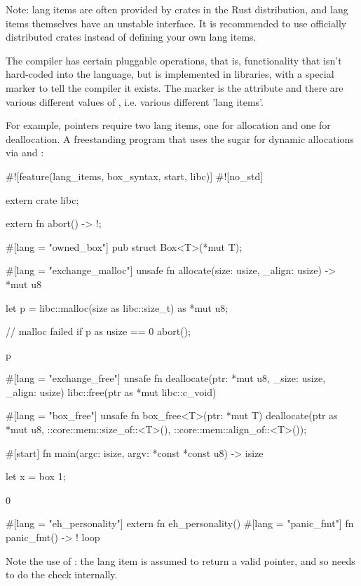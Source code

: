 \begin{myquote}
Note: lang items are often provided by crates in the Rust distribution, and lang items themselves have an unstable 
interface. It is recommended to use officially distributed crates instead of defining your own lang items.
\end{myquote}

The  compiler has certain pluggable operations, that is, functionality that isn't hard-coded into the language, 
but is implemented in libraries, with a special marker to tell the compiler it exists. The marker is the attribute 
\code{\#[lang = \enquote{...}]} and there are various different values of , i.e. various different 'lang items'.

\blank

For example,  pointers require two lang items, one for allocation and one for deallocation. A freestanding program 
that uses the  sugar for dynamic allocations via  and :

\begin{rustc}
#![feature(lang_items, box_syntax, start, libc)]
#![no_std]

extern crate libc;

extern {
    fn abort() -> !;
}

#[lang = "owned_box"]
pub struct Box<T>(*mut T);

#[lang = "exchange_malloc"]
unsafe fn allocate(size: usize, _align: usize) -> *mut u8 {
    let p = libc::malloc(size as libc::size_t) as *mut u8;

    // malloc failed
    if p as usize == 0 {
        abort();
    }

    p
}

#[lang = "exchange_free"]
unsafe fn deallocate(ptr: *mut u8, _size: usize, _align: usize) {
    libc::free(ptr as *mut libc::c_void)
}

#[lang = "box_free"]
unsafe fn box_free<T>(ptr: *mut T) {
    deallocate(ptr as *mut u8, ::core::mem::size_of::<T>(), ::core::mem::align_of::<T>());
}

#[start]
fn main(argc: isize, argv: *const *const u8) -> isize {
    let x = box 1;

    0
}

#[lang = "eh_personality"] extern fn eh_personality() {}
#[lang = "panic_fmt"] fn panic_fmt() -> ! { loop {} }
\end{rustc}

Note the use of : the  lang item is assumed to return a valid pointer, and so needs to 
do the check internally.

